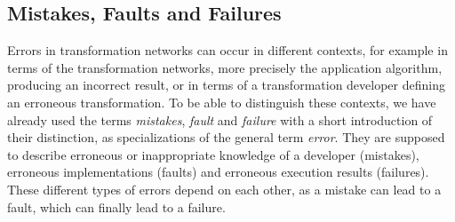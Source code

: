 \subsection{Mistakes, Faults and Failures}

Errors in transformation networks can occur in different contexts, for example in terms of the transformation networks, more precisely the application algorithm, producing an incorrect result, or in terms of a transformation developer defining an erroneous transformation.
To be able to distinguish these contexts, we have already used the terms \emph{mistakes}, \emph{fault} and \emph{failure} with a short introduction of their distinction, as specializations of the general term \emph{error}.
They are supposed to describe erroneous or inappropriate knowledge of a developer (mistakes), erroneous implementations (faults) and erroneous execution results (failures).
These different types of errors depend on each other, as a mistake can lead to a fault, which can finally lead to a failure.

